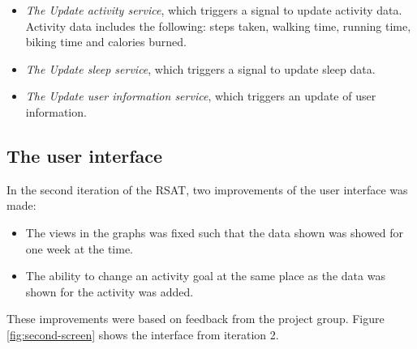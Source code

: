 \documentclass{cslthse-msc}
\begin{document}
\begin{itemize}
\item \emph{The Update activity service}, which triggers a signal to update activity data. Activity data includes the following: steps taken, walking time, running time, biking time and calories burned.
\item \emph{The Update sleep service}, which triggers a signal to update sleep data.
\item \emph{The Update user information service}, which triggers an update of user information.
\end{itemize}


\subsection{The user interface}

In the second iteration of the RSAT, two improvements of the user interface was made:

\begin{itemize}
\item The views in the graphs was fixed such that the data shown was showed for one week at the time. 
\item The ability to change an activity goal at the same place as the data was shown for the activity was added.
\end{itemize}

These improvements were based on feedback from the project group. Figure \ref{fig:second-screen} shows the interface from iteration 2.


\end{document}
